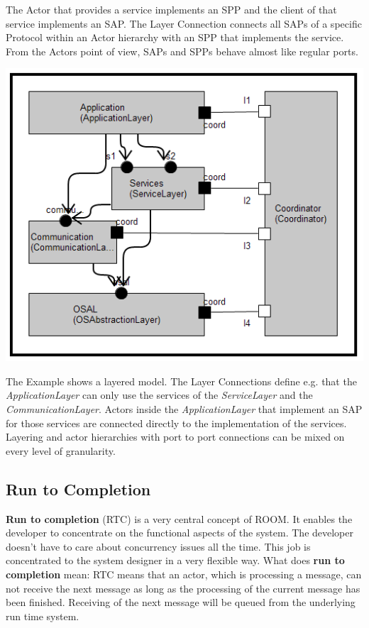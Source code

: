 The Actor that provides a service implements an SPP and the client of that service implements an SAP. The 
Layer Connection connects all SAPs of a specific Protocol within an Actor hierarchy with an SPP that 
implements the service. From the Actors point of view, SAPs and SPPs behave almost like regular ports.

\includegraphics{images/010-LayerExample.png}

The Example shows a layered model. The Layer Connections define e.g. that the \textit{ApplicationLayer} 
can only use the services of the \textit{ServiceLayer} and the \textit{CommunicationLayer}. Actors inside 
the \textit{ApplicationLayer} that implement an SAP for those services are connected directly to the 
implementation of the services. 
Layering and actor hierarchies with port to port connections can be mixed on every level of granularity. 

\subsection{Run to Completion}

\textbf{Run to completion} (RTC) is a very central concept of ROOM. It enables the developer to 
concentrate on the functional aspects of the system. The developer doesn't have to care about concurrency 
issues all the time. This job is concentrated to the system designer in a very flexible way.
What does \textbf{run to completion} mean:
RTC means that an actor, which is processing a message, can not receive the next message as long as the 
processing of the current message has been finished. Receiving of the next message will be queued from the 
underlying run time system.

